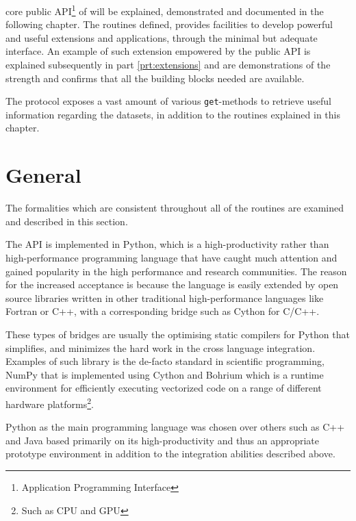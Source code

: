  core public API\footnote{Application Programming Interface} of \CodeName will be explained, demonstrated and documented in the following chapter. The routines defined, provides facilities to develop powerful and useful extensions and applications, through the minimal but adequate interface. An example of such extension empowered by the public \CodeName API is explained subsequently in part \ref{prt:extensions} and are demonstrations of the strength and confirms that all the building blocks needed are available.
\newline

The protocol exposes a vast amount of various \texttt{get}-methods to retrieve useful information regarding the datasets, in addition to the routines explained in this chapter.

\section{General} \label{sec:general}
The formalities which are consistent throughout all of the routines are examined and described in this section.

The API is implemented in Python\cite{PagePython}, which is a high-productivity rather than high-performance programming language that have caught much attention and gained popularity in the high performance and research communities. The reason for the increased acceptance is because the language is easily extended by open source libraries written in other traditional high-performance languages like Fortran or C++, with a corresponding bridge such as Cython\cite{PageCPython} for C/C++. 
\newline

These types of bridges are usually the optimising static compilers for Python that simplifies, and minimizes the hard work in the cross language integration. Examples of such library is the de-facto standard in scientific programming, NumPy \cite{PageNumpy} \cite{oliphant2006guide} that is implemented using Cython and Bohrium \cite{PageBohrium} \cite{kristensen2013bohrium} which is a runtime environment for efficiently executing vectorized code on a range of different hardware platforms\footnote{Such as CPU and GPU}.
\newline

Python as the main programming language was chosen over others such as C++ and Java based primarily on its high-productivity and thus an appropriate prototype environment in addition to the integration abilities described above.
\newline

